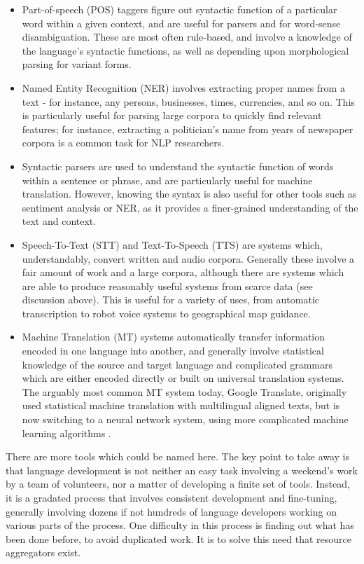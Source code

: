 \begin{itemize}
  \item Part-of-speech (POS) taggers figure out syntactic function of a particular word within a given context, and are useful for parsers and for word-sense disambiguation. These are most often rule-based, and involve a knowledge of the language's syntactic functions, as well as depending upon morphological parsing for variant forms.
  \item Named Entity Recognition (NER) involves extracting proper names from a text - for instance, any persons, businesses, times, currencies, and so on. This is particularly useful for parsing large corpora to quickly find relevant features; for instance, extracting a politician's name from years of newspaper corpora is a common task for NLP researchers.
  \item Syntactic parsers are used to understand the syntactic function of words within a sentence or phrase, and are particularly useful for machine translation. However, knowing the syntax is also useful for other tools such as sentiment analysis or NER, as it provides a finer-grained understanding of the text and context.
  \item Speech-To-Text (STT) and Text-To-Speech (TTS) are systems which, understandably, convert written and audio corpora. Generally these involve a fair amount of work and a large corpora, although there are systems which are able to produce reasonably useful systems from scarce data (see discussion above). This is useful for a variety of uses, from automatic transcription to robot voice systems to geographical map guidance.
  \item Machine Translation (MT) systems automatically transfer information encoded in one language into another, and generally involve statistical knowledge of the source and target language and complicated grammars which are either encoded directly or built on universal translation systems. The arguably most common MT system today, Google Translate, originally used statistical machine translation with multilingual aligned texts, but is now switching to a neural network system, using more complicated machine learning algorithms \citep{google2016google}.
\end{itemize}

There are more tools which could be named here. The key point to take away is that language development is not neither an easy task involving a weekend's work by a team of volunteers, nor a matter of developing a finite set of tools. Instead, it is a gradated process that involves consistent development and fine-tuning, generally involving dozens if not hundreds of language developers working on various parts of the process. One difficulty in this process is finding out what has been done before, to avoid duplicated work. It is to solve this need that resource aggregators exist.

